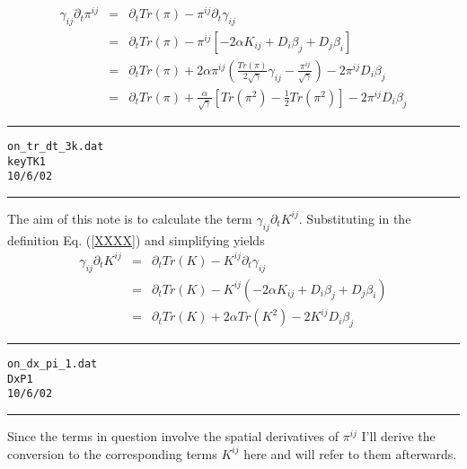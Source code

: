 \documentclass[12pt]{article}
\begin{document}
\begin{eqnarray}\label{TP1_1}
{\gamma}_{i j} \partial_{t} {\pi}^{i j}
& = & \partial_{t} Tr( \pi ) - {\pi}^{i j} \partial_{t} {\gamma}_{i j} \nonumber \\
& = & \partial_{t} Tr( \pi ) - {\pi}^{i j} \left[ -2 \alpha {K}_{i j}
+ D_{i} {\beta}_{j} + D_{j} {\beta}_{i} \right] \nonumber \\
& = & \partial_{t} Tr( \pi ) + 2 \alpha {\pi}^{i j}
\left( \frac{ Tr( \pi ) }{ 2 \sqrt{\gamma} } {\gamma}_{i j}
- \frac{ {\pi}^{i j} }{ \sqrt{\gamma} } \right)
- 2 {\pi}^{i j} D_{i} {\beta}_{j} \nonumber \\
& = & \partial_{t} Tr( \pi ) + \frac{ \alpha }{ \sqrt{\gamma} }
\left[ Tr( \pi ^2 ) - \frac{1}{2} Tr( \pi ^2 ) \right]
- 2 {\pi}^{i j} D_{i} {\beta}_{j}
\end{eqnarray}




\clearpage
\vspace{5mm}
\hrule
\begin{alltt}
  on_tr_dt_3k.dat
  key TK1
  10/6/02
\end{alltt}
\hrule
\vspace{5mm}

The aim of this note is to calculate the term $ {\gamma}_{i j} \partial_{t} {K}^{i j} $.
Substituting in the definition Eq. (\ref{XXXX}) and simplifying yields
\begin{eqnarray}\label{TK1_1}
{\gamma}_{i j} \partial_{t} {K}^{i j}
& = &
\partial_{t} Tr( K ) - {K}^{i j} \partial_{t} {\gamma}_{i j} \nonumber \\
& = &
\partial_{t} Tr( K ) - {K}^{i j} \left( -2 \alpha {K}_{i j}
+ D_{i} {\beta}_{j} + D_{j} {\beta}_{i} \right) \nonumber \\
& = &
\partial_{t} Tr( K ) + 2 \alpha Tr( K ^2 ) - 2 {K}^{i j} D_{i} {\beta}_{j}
\end{eqnarray}


\clearpage
\vspace{5mm}
\hrule
\begin{alltt}
  on_dx_pi_1.dat
  DxP1
  10/6/02
\end{alltt}
\hrule
\vspace{5mm}

Since the terms in question involve the spatial derivatives of $ {\pi}^{i j} $
I'll derive the conversion to the corresponding terms $ {K}^{i j} $ here
and will refer to them afterwards.
\end{document}
